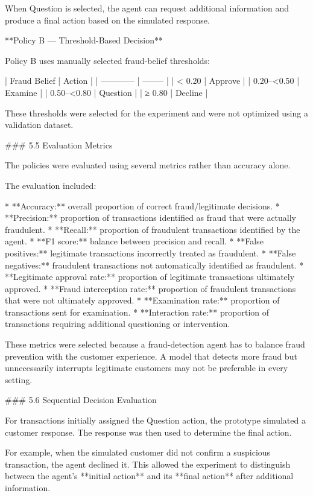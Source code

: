 When Question is selected, the agent can request additional information and produce a final action based on the simulated response.

**Policy B — Threshold-Based Decision**

Policy B uses manually selected fraud-belief thresholds:

| Fraud Belief | Action   |
| ------------ | -------- |
| < 0.20       | Approve  |
| 0.20–<0.50   | Examine  |
| 0.50–<0.80   | Question |
| ≥ 0.80       | Decline  |

These thresholds were selected for the experiment and were not optimized using a validation dataset.

### 5.5 Evaluation Metrics

The policies were evaluated using several metrics rather than accuracy alone.

The evaluation included:

* **Accuracy:** overall proportion of correct fraud/legitimate decisions.
* **Precision:** proportion of transactions identified as fraud that were actually fraudulent.
* **Recall:** proportion of fraudulent transactions identified by the agent.
* **F1 score:** balance between precision and recall.
* **False positives:** legitimate transactions incorrectly treated as fraudulent.
* **False negatives:** fraudulent transactions not automatically identified as fraudulent.
* **Legitimate approval rate:** proportion of legitimate transactions ultimately approved.
* **Fraud interception rate:** proportion of fraudulent transactions that were not ultimately approved.
* **Examination rate:** proportion of transactions sent for examination.
* **Interaction rate:** proportion of transactions requiring additional questioning or intervention.

These metrics were selected because a fraud-detection agent has to balance fraud prevention with the customer experience. A model that detects more fraud but unnecessarily interrupts legitimate customers may not be preferable in every setting.

### 5.6 Sequential Decision Evaluation

For transactions initially assigned the Question action, the prototype simulated a customer response. The response was then used to determine the final action.

For example, when the simulated customer did not confirm a suspicious transaction, the agent declined it. This allowed the experiment to distinguish between the agent's **initial action** and its **final action** after additional information.

